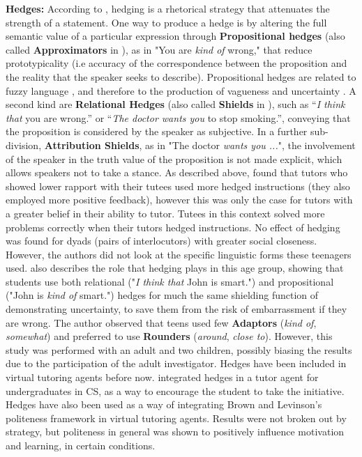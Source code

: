 \documentclass[11pt]{article}
\begin{document}
\noindent\textbf{Hedges:} 
\noindent According to \citet{Fraser2010}, hedging is a rhetorical strategy that attenuates the strength of a statement. One way to produce a hedge is by altering the full semantic value of a particular expression through \textbf{Propositional hedges} (also called \textbf{Approximators} in \citet{Prince1982}), as in "You are \textit{kind of} wrong," that reduce prototypicality (i.e accuracy of the correspondence between the proposition and the reality that the speaker seeks to describe). Propositional hedges are related to fuzzy language \cite{Lakoff1975}, and therefore to the production of vagueness \cite{williamson2002vagueness} and uncertainty \cite{Vincze2014}. \newline
A second kind are \textbf{Relational Hedges} (also called \textbf{Shields} in \citet{Prince1982}), such as “\textit{I think that} you are wrong.” or “\textit{The doctor wants you} to stop smoking.”, conveying that the proposition is considered by the speaker as subjective. In a further sub-division, \textbf{Attribution Shields}, as in "The doctor \textit{wants you ...}", the involvement of the speaker in the truth value of the proposition is not made explicit, which allows speakers not to take a stance. \newline
\noindent As described above, \citet{Madaio2017} found that tutors who showed lower rapport with their tutees used more hedged instructions (they also employed more positive feedback), however this was only the case for tutors with a greater belief in their ability to tutor. Tutees in this context  solved more problems correctly when their tutors hedged instructions. No effect of hedging was found for dyads (pairs of interlocutors) with greater social closeness. However, the authors did not look at the specific linguistic forms these teenagers used. \newline
\noindent \citet{Rowland2007} also describes the role that hedging plays in this age group, showing that students use both relational ("\textit{I think that} John is smart.") and propositional ("John is \textit{kind of} smart.") hedges for much the same shielding function of demonstrating uncertainty, to save them from the risk of embarrassment if they are wrong. The author observed that teens used few \textbf{Adaptors} (\textit{kind of}, \textit{somewhat}) and preferred to use \textbf{Rounders} (\textit{around}, \textit{close to}). However, this study was performed with an adult and two children, possibly biasing the results due to the participation of the adult investigator. Hedges have been included in virtual tutoring agents before now. \cite{Howard2015} integrated hedges in a tutor agent for undergraduates in CS, as a way to encourage the student to take the initiative. Hedges have also been used as a way of integrating Brown and Levinson's politeness framework \citep{Wang2008, Schneider2015} in virtual tutoring agents. Results were not broken out by strategy, but politeness in general was shown to positively influence motivation and learning, in certain conditions.\\ %
\end{document}
